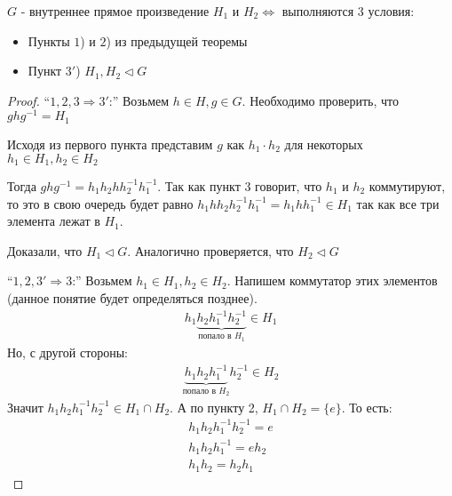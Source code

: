 \begin{theorem-non}
    $G$ - внутреннее прямое произведение $H_1$ и $H_2 \Longleftrightarrow$ выполняются 3 условия: 
    \begin{itemize}
        \item Пункты $1$) и $2$) из предыдущей теоремы
        \item Пункт $3'$) $H_1, H_2 \lhd G$
    \end{itemize}
\end{theorem-non}
\begin{proof}
    \item[]``$1, 2, 3 \Longrightarrow 3'$:'' Возьмем $h \in H, g \in G$. Необходимо
    проверить, что $ghg^{-1} = H_1$
    
    Исходя из первого пункта представим $g$ как $h_1 \cdot h_2$ для некоторых 
    $h_1 \in H_1, h_2 \in H_2$

    Тогда $ghg^{-1} = h_1 h_2 h h_2^{-1} h_1 ^{-1}$. Так как пункт 3 говорит, что $h_1$ и $h_2$ коммутируют, то это
    в свою очередь будет равно $h_1 h h_2 h_2^{-1} h_1^{-1} = h_1 h h_1^{-1} \in H_1$ так как все три элемента лежат в $H_1$. 

    Доказали, что $H_1 \lhd G$. Аналогично проверяется, что $H_2 \lhd G$
    \item[]``$1, 2, 3' \Longrightarrow 3$:'' Возьмем $h_1 \in H_1, h_2 \in H_2$. Напишем коммутатор 
    этих элементов (данное понятие будет определяться позднее). 
    \begin{gather*}
        h_1 \underbrace{h_2 h_1^{-1} h_2^{-1}}_{\text{попало в } H_1} \in H_1
    \end{gather*} 
    Но, с другой стороны: 
    \begin{gather*}
        \underbrace{h_1 h_2 h_1^{-1}}_{\text{попало в } H_2} h_2^{-1} \in H_2
    \end{gather*} 
    Значит $h_1 h_2 h_1^{-1} h_2^{-1} \in H_1 \cap H_2$. А по пункту 2, $H_1 \cap H_2 = \{e\}$. То есть: 
    \begin{gather*}
        h_1 h_2 h_1^{-1} h_2^{-1} = e \\
        h_1 h_2 h_1^{-1} = e h_2 \\
        h_1 h_2 = h_2 h_1
    \end{gather*}
\end{proof}